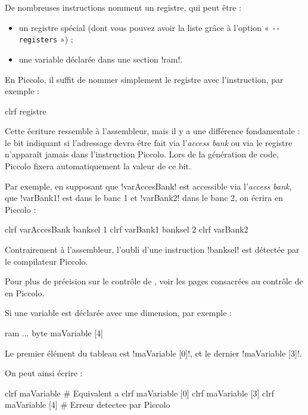 De nombreuses instructions nomment un registre, qui peut être :
\begin{itemize}
  \item un registre spécial (dont vous pouvez avoir la liste grâce à l'option « \texttt{-{}-registers} ») ;
  \item une variable déclarée dans une section \pic!ram!.
\end{itemize}

En Piccolo, il suffit de nommer simplement le registre avec l'instruction, par exemple :
\begin{piccolo}
clrf registre
\end{piccolo}

Cette écriture ressemble à l'assembleur, mais il y a une différence fondamentale : le bit indiquant si l'adressage devra être fait via l'\emph{access bank} ou via le registre  n'apparaît jamais dans l'instruction Piccolo. Lors de la génération de code, Piccolo fixera automatiquement la valeur de ce bit.

Par exemple, en supposant que \pic!varAccesBank! est accessible via l'\emph{access bank}, que \pic!varBank1! est dans le banc 1 et \pic!varBank2! dans le banc 2, on écrira en Piccolo :

\begin{piccolo}
clrf varAccesBank
banksel 1
clrf varBank1
banksel 2
clrf varBank2
\end{piccolo}

Contrairement à l'assembleur, l'oubli d'une instruction \pic!banksel! est détectée par le compilateur Piccolo.

Pour plus de précision sur le contrôle de , voir les pages consacrées au contrôle de  en Piccolo.

Si une variable est déclarée avec une dimension, par exemple :
\begin{piccolo}
ram ... { 
  byte maVariable [4]
}
\end{piccolo}

Le premier élément du tableau est \pic!maVariable [0]!, et le dernier  \pic!maVariable [3]!.

On peut ainsi écrire :
\begin{piccolo}
  clrf maVariable # Equivalent a clrf maVariable [0]
  clrf maVariable [3]
  clrf maVariable [4] # Erreur detectee par Piccolo
\end{piccolo}











